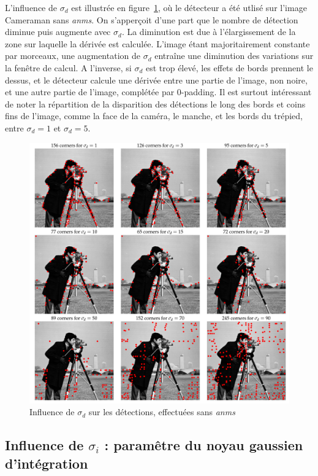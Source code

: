 \documentclass[12pt,a4paper,onecolumn]{article}
\begin{document}
L'influence de \(\sigma_d\) est illustrée en figure~\ref{fig_2_sigma_d}, où le détecteur a été utlisé sur l'image Cameraman sans \textit{anms}. On s'apperçoit d'une part que le nombre de détection diminue puis augmente avec \(\sigma_d\). La diminution est due à l'élargissement de la zone sur laquelle la dérivée est calculée. L'image étant majoritairement constante par morceaux, une augmentation de \(\sigma_d\) entraîne une diminution des variations sur la fenêtre de calcul. A l'inverse, si \(\sigma_d\) est trop élevé, les effets de bords prennent le dessus, et le détecteur calcule une dérivée entre une partie de l'image, non noire, et une autre partie de l'image, complétée par 0-padding.
Il est surtout intéressant de noter la répartition de la disparition des détections le long des bords et coins fins de l'image, comme la face de la caméra, le manche, et les bords du trépied, entre \(\sigma_d = 1\) et \(\sigma_d = 5\).

\begin{figure}[H]
	\centering
	\includegraphics[width = 1.0\textwidth]{2_cameraman_sd}
	\caption{Influence de \(\sigma_d\) sur les détections, effectuées sans \textit{anms}}
	\label{fig_2_sigma_d}
\end{figure}

\subsection{Influence de \(\sigma_i\) : paramêtre du noyau gaussien d'intégration}
\end{document}
